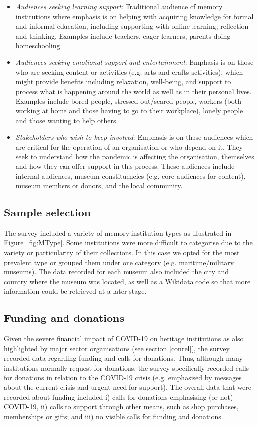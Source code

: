 \documentclass{egpubl}
\begin{document}
\begin{itemize}
	\item \textit{Audiences seeking learning support}: Traditional audience of memory institutions where emphasis is on helping with acquiring knowledge for formal and informal education, including supporting with online learning, reflection and thinking. Examples include teachers, eager learners, parents doing homeschooling.
	\item \textit{Audiences seeking emotional support and entertainment}: Emphasis is on those who are seeking content or activities (e.g. arts and crafts activities), which might provide benefits including relaxation, well-being, and support to process what is happening around the world as well as in their personal lives. Examples include bored people, stressed out/scared people, workers (both working at home and those having to go to their workplace), lonely people and those wanting to help others. 
	\item \textit{Stakeholders who wish to keep involved}: Emphasis is on those audiences which are critical for the operation of an organisation or who depend on it. They seek to understand how the pandemic is affecting the organisation, themselves and how they can offer support in this process. These audiences include internal audiences, museum constituencies (e.g. core audiences for content), museum members or donors, and the local community.
\end{itemize}


\subsection{Sample selection}
The survey included a variety of memory institution types as illustrated in Figure~\ref{fig:MType}. Some institutions were more difficult to categorise due to the variety or particularity of their collections. In this case we opted for the most prevalent type or grouped them under one category (e.g. maritime/military museums). The data recorded for each museum also included the city and country where the museum was located, as well as a Wikidata code so that more information could be retrieved at a later stage.

\subsection{Funding and donations}
\label{fund}
Given the severe financial impact of COVID-19 on heritage institutions as also highlighted by major sector organisations (see section \ref{conrel}), the survey recorded data regarding funding and calls for donations. Thus, although many institutions normally request for donations, the survey specifically recorded calls for donations in relation to the COVID-19 crisis (e.g. emphasised by messages about the current crisis and urgent need for support). The overall data that were recorded about funding included i) calls for donations emphasising (or not)  COVID-19, ii) calls to support through other means, such as shop purchases, memberships or gifts; and iii) no visible calls for funding and donations.
\end{document}
